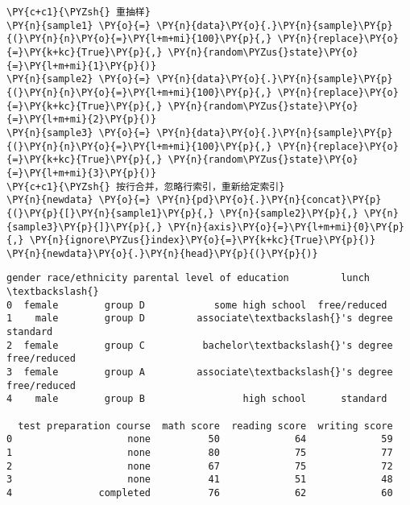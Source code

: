     \begin{tcolorbox}[breakable, size=fbox, boxrule=1pt, pad at break*=1mm,colback=cellbackground, colframe=cellborder]
\begin{Verbatim}[commandchars=\\\{\}]
\PY{c+c1}{\PYZsh{} 重抽样}
\PY{n}{sample1} \PY{o}{=} \PY{n}{data}\PY{o}{.}\PY{n}{sample}\PY{p}{(}\PY{n}{n}\PY{o}{=}\PY{l+m+mi}{100}\PY{p}{,} \PY{n}{replace}\PY{o}{=}\PY{k+kc}{True}\PY{p}{,} \PY{n}{random\PYZus{}state}\PY{o}{=}\PY{l+m+mi}{1}\PY{p}{)}
\PY{n}{sample2} \PY{o}{=} \PY{n}{data}\PY{o}{.}\PY{n}{sample}\PY{p}{(}\PY{n}{n}\PY{o}{=}\PY{l+m+mi}{100}\PY{p}{,} \PY{n}{replace}\PY{o}{=}\PY{k+kc}{True}\PY{p}{,} \PY{n}{random\PYZus{}state}\PY{o}{=}\PY{l+m+mi}{2}\PY{p}{)}
\PY{n}{sample3} \PY{o}{=} \PY{n}{data}\PY{o}{.}\PY{n}{sample}\PY{p}{(}\PY{n}{n}\PY{o}{=}\PY{l+m+mi}{100}\PY{p}{,} \PY{n}{replace}\PY{o}{=}\PY{k+kc}{True}\PY{p}{,} \PY{n}{random\PYZus{}state}\PY{o}{=}\PY{l+m+mi}{3}\PY{p}{)}
\PY{c+c1}{\PYZsh{} 按行合并，忽略行索引，重新给定索引}
\PY{n}{newdata} \PY{o}{=} \PY{n}{pd}\PY{o}{.}\PY{n}{concat}\PY{p}{(}\PY{p}{[}\PY{n}{sample1}\PY{p}{,} \PY{n}{sample2}\PY{p}{,} \PY{n}{sample3}\PY{p}{]}\PY{p}{,} \PY{n}{axis}\PY{o}{=}\PY{l+m+mi}{0}\PY{p}{,} \PY{n}{ignore\PYZus{}index}\PY{o}{=}\PY{k+kc}{True}\PY{p}{)}
\PY{n}{newdata}\PY{o}{.}\PY{n}{head}\PY{p}{(}\PY{p}{)}
\end{Verbatim}
\end{tcolorbox}

            \begin{tcolorbox}[breakable, size=fbox, boxrule=.5pt, pad at break*=1mm, opacityfill=0]
\begin{Verbatim}[commandchars=\\\{\}]
   gender race/ethnicity parental level of education         lunch  \textbackslash{}
0  female        group D            some high school  free/reduced
1    male        group D         associate\textbackslash{}'s degree      standard
2  female        group C          bachelor\textbackslash{}'s degree  free/reduced
3  female        group A         associate\textbackslash{}'s degree  free/reduced
4    male        group B                 high school      standard

  test preparation course  math score  reading score  writing score
0                    none          50             64             59
1                    none          80             75             77
2                    none          67             75             72
3                    none          41             51             48
4               completed          76             62             60
\end{Verbatim}
\end{tcolorbox}
